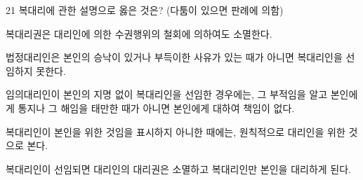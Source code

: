 \begin{question}{21}
복대리에 관한 설명으로 옳은 것은? (다툼이 있으면 판례에 의함)
\begin{choices}
  \item 복대리권은 대리인에 의한 수권행위의 철회에 의하여도 소멸한다.
  \item 법정대리인은 본인의 승낙이 있거나 부득이한 사유가 있는 때가 아니면 복대리인을 선임하지 못한다.
  \item 임의대리인이 본인의 지명 없이 복대리인을 선임한 경우에는, 그 부적임을 알고 본인에게 통지나 그 해임을 태만한 때가 아니면 본인에게 대하여 책임이 없다.
  \item 복대리인이 본인을 위한 것임을 표시하지 아니한 때에는, 원칙적으로 대리인을 위한 것으로 본다.
  \item 복대리인이 선임되면 대리인의 대리권은 소멸하고 복대리인만 본인을 대리하게 된다.
\end{choices}
\end{question}
